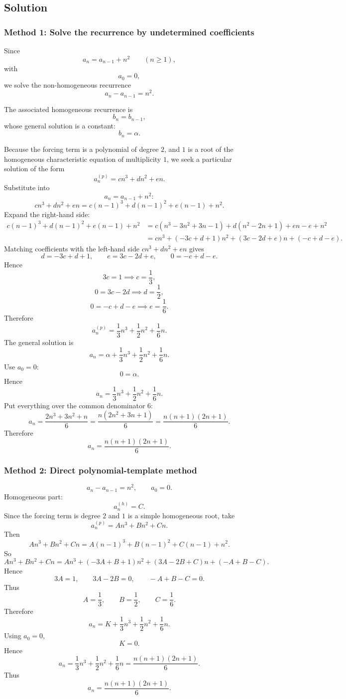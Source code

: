 \documentclass[12pt]{article}
\begin{document}
\subsection{Solution}

\subsubsection{Method 1: Solve the recurrence by undetermined coefficients}
Since
\[
a_n=a_{n-1}+n^2 \qquad (n\ge 1),
\]
with
\[
a_0=0,
\]
we solve the non-homogeneous recurrence
\[
a_n-a_{n-1}=n^2.
\]

The associated homogeneous recurrence is
\[
b_n=b_{n-1},
\]
whose general solution is a constant:
\[
b_n=\alpha.
\]

Because the forcing term is a polynomial of degree \(2\), and \(1\) is a root of the homogeneous characteristic equation of multiplicity \(1\), we seek a particular solution of the form
\[
a_n^{(p)}=cn^3+dn^2+en.
\]
Substitute into
\[
a_n=a_{n-1}+n^2:
\]
\[
cn^3+dn^2+en
=
c(n-1)^3+d(n-1)^2+e(n-1)+n^2.
\]
Expand the right-hand side:
\begin{align*}
c(n-1)^3+d(n-1)^2+e(n-1)+n^2
&=c(n^3-3n^2+3n-1)+d(n^2-2n+1)+en-e+n^2\\
&=cn^3+(-3c+d+1)n^2+(3c-2d+e)n+(-c+d-e).
\end{align*}
Matching coefficients with the left-hand side \(cn^3+dn^2+en\) gives
\[
d=-3c+d+1,\qquad e=3c-2d+e,\qquad 0=-c+d-e.
\]
Hence
\[
3c=1 \implies c=\frac13,
\]
\[
0=3c-2d \implies d=\frac12,
\]
\[
0=-c+d-e \implies e=\frac16.
\]
Therefore
\[
a_n^{(p)}=\frac13 n^3+\frac12 n^2+\frac16 n.
\]
The general solution is
\[
a_n=\alpha+\frac13 n^3+\frac12 n^2+\frac16 n.
\]
Use \(a_0=0\):
\[
0=\alpha.
\]
Hence
\[
a_n=\frac13 n^3+\frac12 n^2+\frac16 n.
\]
Put everything over the common denominator \(6\):
\[
a_n=\frac{2n^3+3n^2+n}{6}
=\frac{n(2n^2+3n+1)}{6}
=\frac{n(n+1)(2n+1)}{6}.
\]
Therefore
\[
\boxed{a_n=\frac{n(n+1)(2n+1)}{6}.}
\]

\newpage
\subsubsection{Method 2: Direct polynomial-template method}
\[
a_n-a_{n-1}=n^2,\qquad a_0=0.
\]
Homogeneous part:
\[
a_n^{(h)}=C.
\]
Since the forcing term is degree \(2\) and \(1\) is a simple homogeneous root, take
\[
a_n^{(p)}=An^3+Bn^2+Cn.
\]
Then
\[
An^3+Bn^2+Cn
=
A(n-1)^3+B(n-1)^2+C(n-1)+n^2.
\]
So
\[
An^3+Bn^2+Cn
=
An^3+(-3A+B+1)n^2+(3A-2B+C)n+(-A+B-C).
\]
Hence
\[
3A=1,\qquad 3A-2B=0,\qquad -A+B-C=0.
\]
Thus
\[
A=\frac13,\qquad B=\frac12,\qquad C=\frac16.
\]
Therefore
\[
a_n=K+\frac13 n^3+\frac12 n^2+\frac16 n.
\]
Using \(a_0=0\),
\[
K=0.
\]
Hence
\[
a_n=\frac13 n^3+\frac12 n^2+\frac16 n
=\frac{n(n+1)(2n+1)}{6}.
\]
Thus
\[
\boxed{a_n=\frac{n(n+1)(2n+1)}{6}.}
\]
\end{document}
